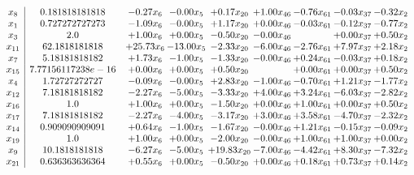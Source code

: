\documentclass[8pt]{article}
\begin{document}
\[\begin{array}{c| c c@{\hskip 2pt} c@{\hskip 2pt} c@{\hskip 2pt} c@{\hskip 2pt} c@{\hskip 2pt} c@{\hskip 2pt} c@{\hskip 2pt} }
 x_{8}   &  0.181818181818 & -0.27 x_{6} & -0.00 x_{5} & +  0.17 x_{20} & +  1.00 x_{46} & -0.76 x_{61} & -0.03 x_{37} & -0.32 x_{2}\\
 x_{1}   &  0.727272727273 & -1.09 x_{6} & -0.00 x_{5} & +  1.17 x_{20} & +  0.00 x_{46} & -0.03 x_{61} & -0.12 x_{37} & -0.77 x_{2}\\
 x_{3}   &  2.0 & +  1.00 x_{6} & +  0.00 x_{5} & -0.50 x_{20} & -0.00 x_{46} &   & +  0.00 x_{37} & +  0.50 x_{2}\\
 x_{11}   &  62.1818181818 & + 25.73 x_{6} & -13.00 x_{5} & -2.33 x_{20} & -6.00 x_{46} & -2.76 x_{61} & +  7.97 x_{37} & +  2.18 x_{2}\\
 x_{7}   &  5.18181818182 & +  1.73 x_{6} & -1.00 x_{5} & -1.33 x_{20} & -0.00 x_{46} & +  0.24 x_{61} & -0.03 x_{37} & +  0.18 x_{2}\\
 x_{15}   &  7.77156117238e-16 & +  0.00 x_{6} & +  0.00 x_{5} & +  0.50 x_{20} &   & +  0.00 x_{61} & +  0.00 x_{37} & +  0.50 x_{2}\\
 x_{4}   &  1.72727272727 & -0.09 x_{6} & -0.00 x_{5} & +  2.83 x_{20} & -1.00 x_{46} & -0.70 x_{61} & +  1.21 x_{37} & -1.77 x_{2}\\
 x_{12}   &  7.18181818182 & -2.27 x_{6} & -5.00 x_{5} & -3.33 x_{20} & +  4.00 x_{46} & +  3.24 x_{61} & -6.03 x_{37} & -2.82 x_{2}\\
 x_{16}   &  1.0 & +  1.00 x_{6} & +  0.00 x_{5} & -1.50 x_{20} & +  0.00 x_{46} & +  1.00 x_{61} & +  0.00 x_{37} & +  0.50 x_{2}\\
 x_{17}   &  7.18181818182 & -2.27 x_{6} & -4.00 x_{5} & -3.17 x_{20} & +  3.00 x_{46} & +  3.58 x_{61} & -4.70 x_{37} & -2.32 x_{2}\\
 x_{14}   &  0.909090909091 & +  0.64 x_{6} & -1.00 x_{5} & -1.67 x_{20} & -0.00 x_{46} & +  1.21 x_{61} & -0.15 x_{37} & -0.09 x_{2}\\
 x_{19}   &  1.0 & +  1.00 x_{6} & +  0.00 x_{5} & -2.00 x_{20} & -0.00 x_{46} & +  1.00 x_{61} & +  1.00 x_{37} & +  0.00 x_{2}\\
 x_{9}   &  10.1818181818 & -6.27 x_{6} & -5.00 x_{5} & + 19.83 x_{20} & -7.00 x_{46} & -4.42 x_{61} & +  8.30 x_{37} & -7.32 x_{2}\\
 x_{21}   &  0.636363636364 & +  0.55 x_{6} & +  0.00 x_{5} & -0.50 x_{20} & +  0.00 x_{46} & +  0.18 x_{61} & +  0.73 x_{37} & +  0.14 x_{2}\\

\end{array}\]
\end{document}

